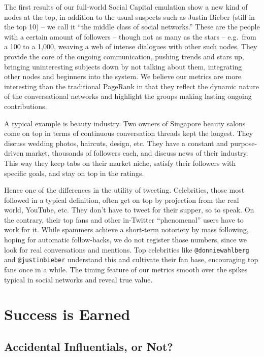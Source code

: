 \documentclass[10pt,oneside]{memoir}
\begin{document}
The first results of our full-world Social Capital emulation show a new kind of nodes at the top, in addition to the usual suspects such as Justin Bieber (still in the top 10) -- we call it ``the middle class of social networks.'' These are the people with a certain amount of followers -- though not as many as the stars -- e.g.\ from a 100 to a 1,000, weaving a web of intense dialogues with other such nodes. They provide the core of the ongoing communication, pushing trends and stars up, bringing uninteresting subjects down by not talking about them, integrating other nodes and beginners into the system. We believe our metrics are more interesting than the traditional PageRank in that they reflect the dynamic nature of the conversational networks and highlight the groups making lasting ongoing contributions.


A typical example is beauty industry. Two owners of Singapore beauty salons come on top in terms of continuous conversation threads kept the longest. They discuss wedding photos, haircuts, design, etc. They have a constant and purpose-driven market, thousands of followers each, and discuss news of their industry. This way they keep tabs on their market niche, satisfy their followers with specific goals, and stay on top in the ratings.


Hence one of the differences in the utility of tweeting. Celebrities, those most followed in a typical definition, often get on top by projection from the real world, YouTube, etc. They don't have to tweet for their supper, so to speak. On the contrary, their top fans and other in-Twitter ``phenomenal'' users have to work for it. While spammers achieve a short-term notoriety by mass following, hoping for automatic follow-backs, we do not register those numbers, since we look for real conversations and mentions. Top celebrities like \texttt{@donniewahlberg} and \texttt{@justinbieber} understand this and cultivate their fan base, encouraging top fans once in a while. The timing feature of our metrics smooth over the spikes typical in social networks and reveal true value.


\pagebreak \chapter{Success is Earned}
\label{successisearned}

\section{Accidental Influentials, or Not?}
\label{accidentalinfluentialsornot}
\end{document}
